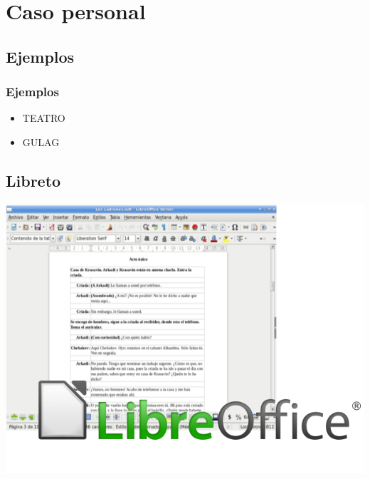 %
%

\section{Caso personal}

\subsection{Ejemplos}
\begin{frame}
    \frametitle{Ejemplos}
        \begin{itemize}
            \item TEATRO
            \item GULAG
        \end{itemize}
\end{frame}

\subsection{Libreto}
\begin{frame}
     \includegraphics[width=\textwidth]{MiLibreto.png}
\end{frame}

